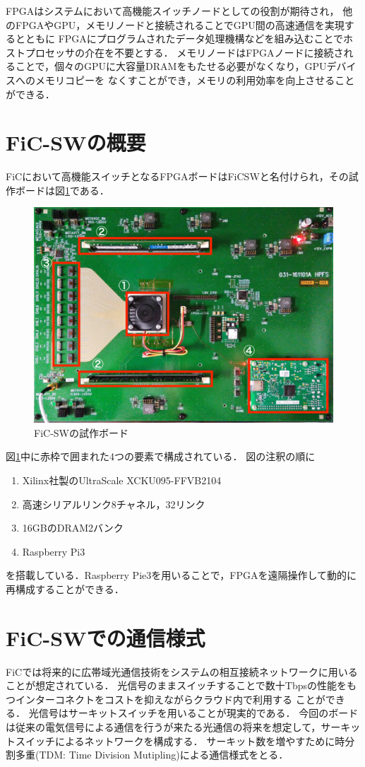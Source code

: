 {  FPGAはシステムにおいて高機能スイッチノードとしての役割が期待され，
  他のFPGAやGPU，メモリノードと接続されることでGPU間の高速通信を実現するとともに
  FPGAにプログラムされたデータ処理機構などを組み込むことでホストプロセッサの介在を不要とする．
  メモリノードはFPGAノードに接続されることで，個々のGPUに大容量DRAMをもたせる必要がなくなり，GPUデバイスへのメモリコピーを
  なくすことができ，メモリの利用効率を向上させることができる．
  
  \section{FiC-SWの概要}
  \label{sec:about_ficsw}
  FiCにおいて高機能スイッチとなるFPGAボードはFiCSWと名付けられ，その試作ボードは図\ref{fig:ficsw}である．
  
  \begin{figure}[h]
    \centering
    \includegraphics[width=12cm]{./chap3/fig/ficsw.png}
    \caption{FiC-SWの試作ボード}
    \label{fig:ficsw}
  \end{figure}
  
  図\ref{fig:ficsw}中に赤枠で囲まれた4つの要素で構成されている．
  図の注釈の順に
  \begin{enumerate}
    \item Xilinx社製のUltraScale XCKU095-FFVB2104
    \item 高速シリアルリンク8チャネル，32リンク
    \item 16GBのDRAM2バンク
    \item Raspberry Pi3
  \end{enumerate}
  を搭載している．Raspberry Pie3を用いることで，FPGAを遠隔操作して動的に再構成することができる．
  
  \section{FiC-SWでの通信様式}
  \label{sec:ficsw_communication}
  FiCでは将来的に広帯域光通信技術をシステムの相互接続ネットワークに用いることが想定されている．
  光信号のままスイッチすることで数十Tbpsの性能をもつインターコネクトをコストを抑えながらクラウド内で利用する
  ことができる．
  光信号はサーキットスイッチを用いることが現実的である．
  今回のボードは従来の電気信号による通信を行うが来たる光通信の将来を想定して，サーキットスイッチによるネットワークを構成する．
  サーキット数を増やすために時分割多重(TDM: Time Division Mutipling)による通信様式をとる．
  
}
